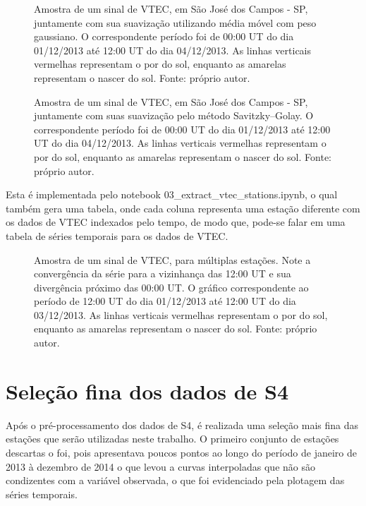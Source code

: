\begin{figure}[H]
\centering
{}
\caption{Amostra de um sinal de VTEC, em São José dos Campos - SP, juntamente com sua suavização utilizando média móvel com peso gaussiano. O correspondente período foi de 00:00 UT do dia 01/12/2013 até 12:00 UT do dia 04/12/2013. As linhas verticais vermelhas representam o por do sol, enquanto as amarelas representam o nascer do sol. Fonte: próprio autor.}
\label{fig:vtecsj2gauss}
%
\centering
{}
\caption{Amostra de um sinal de VTEC, em São José dos Campos - SP, juntamente com suas suavização pelo método Savitzky–Golay. O correspondente período foi de 00:00 UT do dia 01/12/2013 até 12:00 UT do dia 04/12/2013. As linhas verticais vermelhas representam o por do sol, enquanto as amarelas representam o nascer do sol. Fonte: próprio autor.}
\label{fig:vtecsj2savi}
\end{figure}

\vspace{-16pt}
Esta é implementada pelo notebook 03\_extract\_vtec\_stations.ipynb, o qual também gera uma tabela, onde cada coluna representa uma estação diferente com os dados de VTEC indexados pelo tempo, de modo que, pode-se falar em uma tabela de séries temporais para os dados de VTEC.

\begin{figure}[H]
\caption{Amostra de um sinal de VTEC, para múltiplas estações. Note a convergência da série para a vizinhança das 12:00 UT e sua divergência próximo das 00:00 UT. O gráfico correspondente ao período de 12:00 UT do dia 01/12/2013 até 12:00 UT do dia 03/12/2013. As linhas verticais vermelhas representam o por do sol, enquanto as amarelas representam o nascer do sol. Fonte: próprio autor.}
\label{fig:vtecsignal}
\end{figure}

\vspace{-16pt}
\section{Seleção fina dos dados de S4}

Após o pré-processamento dos dados de S4, é realizada uma seleção mais fina das estações que serão utilizadas neste trabalho. O primeiro conjunto de estações descartas o foi, pois apresentava poucos pontos ao longo do período de janeiro de 2013 à dezembro de 2014 o que levou a curvas interpoladas que não são condizentes com a variável observada, o que foi evidenciado pela plotagem das séries temporais. 

